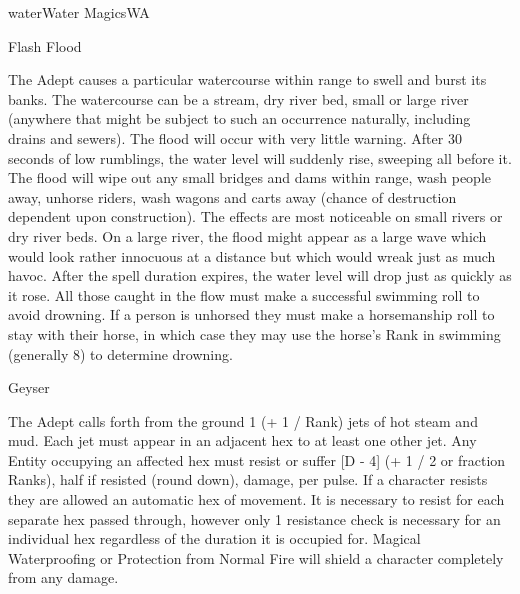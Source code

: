 \begin{college}[1.3]{water}{Water Magics}{WA}
\begin{spell}[S-3]{Flash Flood}
\begin{effects}
The Adept causes a particular watercourse within range to swell and
burst its banks. The watercourse can be a stream, dry river bed, small
or large river (\ie anywhere that might be subject to such an
occurrence naturally, including drains and sewers). The flood will
occur with very little warning.  After 30 seconds of low rumblings,
the water level will suddenly rise, sweeping all before it. The flood
will wipe out any small bridges and dams within range, wash people
away, unhorse riders, wash wagons and carts away (chance of
destruction dependent upon construction). The effects are most
noticeable on small rivers or dry river beds.  On a large river, the
flood might appear as a large wave which would look rather innocuous
at a distance but which would wreak just as much havoc. After the
spell duration expires, the water level will drop just as quickly as
it rose. All those caught in the flow must make a successful swimming
roll to avoid drowning. If a person is unhorsed they must make a
horsemanship roll to stay with their horse, in which case they may use
the horse's Rank in swimming (generally 8) to determine drowning.
\end{effects}
\end{spell}

\begin{spell}[S-4]{Geyser}

\begin{effects}
The Adept calls forth from the ground 1 (+ 1 / Rank) jets of hot steam
and mud. Each jet must appear in an adjacent hex to at least one other
jet. Any Entity occupying an affected hex must resist or suffer [D -
4] (+ 1 / 2 or fraction Ranks), half if resisted (round down), damage,
per pulse. If a character resists they are allowed an automatic hex of
movement. It is necessary to resist for each separate hex passed
through, however only 1 resistance check is necessary for an
individual hex regardless of the duration it is occupied for. Magical
Waterproofing or Protection from Normal Fire will shield a character
completely from any damage.
\end{effects}
\end{spell}


\end{college}
